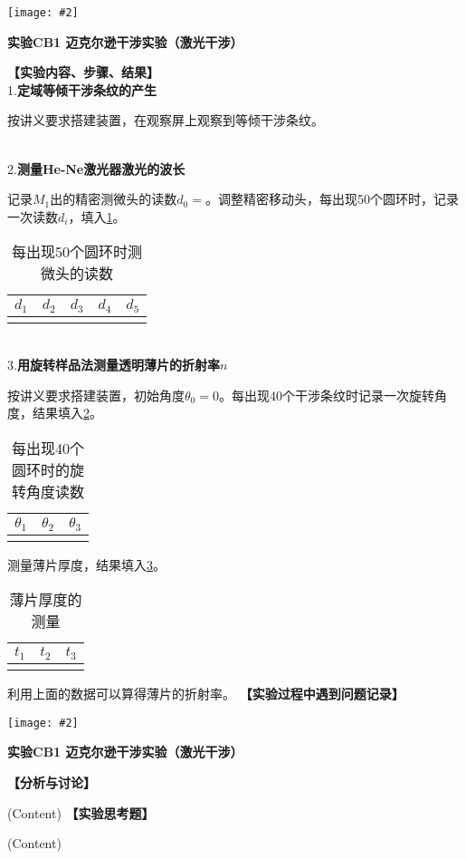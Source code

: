 \documentclass[11pt,a4paper]{ctexart}
\newcommand{\ExpeName}{实验CB1 迈克尔逊干涉实验（激光干涉）}
\newcommand{\cpic}[2]{
\begin{center}
\texttt{[image: \#2]}
\end{center}
}
\newcommand{\emptyline}{\par \ \\}
\begin{document}
\newpage%
\cpic{0.255}{e2}%
\begin{center}
\LARGE{\textbf{\ExpeName}}
\end{center}
\textbf{【实验内容、步骤、结果】}
\\
1.\textbf{定域等倾干涉条纹的产生}\par
按讲义要求搭建装置，在观察屏上观察到等倾干涉条纹。
\emptyline
2.\textbf{测量He-Ne激光器激光的波长}\par
记录$M_1$出的精密测微头的读数$d_0 = $\uline{\hspace{2cm}}。调整精密移动头，每出现50个圆环时，记录一次读数$d_i$，填入\cref{table1}。
\begin{table}[H]
\centering
\caption{每出现50个圆环时测微头的读数}
\label{table1}
\begin{tabular}{|p{15mm}|p{15mm}|p{15mm}|p{15mm}|p{15mm}|}
\hline
$d_1$ & $d_2$ & $d_3$ & $d_4$ & $d_5$ \\ \hline
 &  &  &  &  \\ \hline
\end{tabular}
\end{table}
\emptyline
3.\textbf{用旋转样品法测量透明薄片的折射率$n$}\par
按讲义要求搭建装置，初始角度$\theta_0 = 0$。每出现40个干涉条纹时记录一次旋转角度，结果填入\cref{table2}。
\begin{table}[H]
\centering
\caption{每出现40个圆环时的旋转角度读数}
\label{table2}
\begin{tabular}{|p{20mm}|p{20mm}|p{20mm}|}
\hline
$\theta_1$ & $\theta_2$ & $\theta_3$ \\ \hline
 &  &  \\ \hline
\end{tabular}
\end{table}
测量薄片厚度，结果填入\cref{table3}。
\begin{table}[H]
\centering
\caption{薄片厚度的测量}
\label{table3}
\begin{tabular}{|p{20mm}|p{20mm}|p{20mm}|}
\hline
$t_1$ & $t_2$ & $t_3$ \\ \hline
 &  &  \\ \hline
\end{tabular}
\end{table}
利用上面的数据可以算得薄片的折射率。
\newpage
\textbf{【实验过程中遇到问题记录】}

%

\newpage%
\cpic{0.255}{e3}%
\begin{center}
\LARGE\textbf{{\ExpeName}}
\end{center}
\textbf{【分析与讨论】}\par
(Content)
\newline
\textbf{【实验思考题】}\par
(Content)
\end{document}
